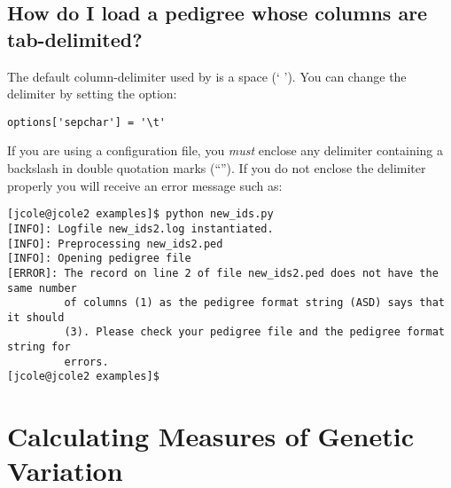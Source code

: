 \subsection{How do I load a pedigree whose columns are tab-delimited?}
\label{sec:howto-load-tab-delimited-pedigree}
The default column-delimiter used by \PyPedal{} is a space (` ').  You can change the delimiter by setting the  option:
\begin{verbatim}
options['sepchar'] = '\t'
\end{verbatim}
If you are using a configuration file, you \emph{must} enclose any delimiter containing a backslash in double quotation marks (``'').
If you do not enclose the delimiter properly you will receive an error message such as:
\begin{verbatim}
[jcole@jcole2 examples]$ python new_ids.py
[INFO]: Logfile new_ids2.log instantiated.
[INFO]: Preprocessing new_ids2.ped
[INFO]: Opening pedigree file
[ERROR]: The record on line 2 of file new_ids2.ped does not have the same number
         of columns (1) as the pedigree format string (ASD) says that it should
         (3). Please check your pedigree file and the pedigree format string for
         errors.
[jcole@jcole2 examples]$
\end{verbatim}

\section{Calculating Measures of Genetic Variation}
\label{sec:howto-genetic-variation}

